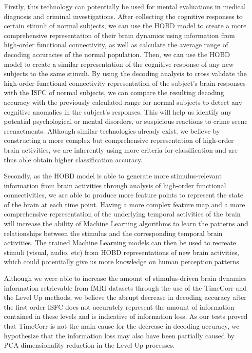 \documentclass[11pt]{article}
\begin{document}
Firstly, this technology can potentially be used for mental evaluations in medical diagnosis and criminal investigations. After collecting the cognitive responses to certain stimuli of normal subjects, we can use the HOBD model to create a more comprehensive representation of their brain dynamics using information from high-order functional connectivity, as well as calculate the average range of decoding accuracies of the normal population. Then, we can use the HOBD model to create a similar representation of the cognitive response of any new subjects to the same stimuli. By using the decoding analysis to cross validate the high-order functional connectivity representation of the subject's brain responses with the ISFC of normal subjects, we can compare the resulting decoding accuracy with the previously calculated range for normal subjects to detect any cognitive anomalies in the subject's responses. This will help us identify any potential psychological or mental disorders, or suspicious reactions to crime scene reenactments. Although similar technologies already exist, we believe by constructing a more complex but comprehensive representation of high-order brain activities, we are inherently using more criteria for classification and are thus able obtain higher classification accuracy.

Secondly, as the HOBD model is able to generate more stimulus-relevant information from brain activities through analysis of high-order functional connectivities, we are able to produce more feature points to represent the state of the brain at each time point. Having a more complex feature map and a more comprehensive representation of the underlying temporal activities of the brain will increase the ability of Machine Learning algorithms to learn the patterns and relationships between the stimulus and the corresponding temporal brain activities. The trained Machine Learning models can then be used to recreate stimuli (visual, audio, etc) from HOBD representations of new brain activities, which could potentially give us more knowledge on human perception patterns.

Although we were able to increase the amount of stimulus-driven brain dynamics information retrievable from fMRI datasets through the use of the TimeCorr and the Level Up methods, we believe the abrupt decrease in decoding accuracy after the first order ISFC does not accurately represent the amount of information contained in these levels and is indicative of information loss. As our tests proved that TimeCorr is not the main cause for the decrease in decoding accuracy, we hypothesize that the information loss may also have been partially caused by PCA dimensionality reduction in the Level Up processes.
\end{document}
